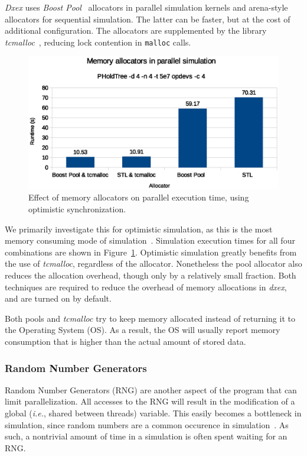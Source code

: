 \textit{Dxex} uses \textit{Boost Pool}~\cite{boostpool} allocators in parallel simulation kernels and arena-style allocators for sequential simulation.
The latter can be faster, but at the cost of additional configuration.
The allocators are supplemented by the library \textit{tcmalloc}~\cite{tcmalloc}, reducing lock contention in \texttt{malloc} calls.

\begin{figure}
    \center
    \includegraphics[width=\columnwidth]{fig/memory_allocators_parallel.eps}
    \caption{Effect of memory allocators on parallel execution time, using optimistic synchronization.}
    \label{fig:memallocators_parallel}
\end{figure}

We primarily investigate this for optimistic simulation, as this is the most memory consuming mode of simulation~\cite{FujimotoBook}.
Simulation execution times for all four combinations are shown in Figure~\ref{fig:memallocators_parallel}.
Optimistic simulation greatly benefits from the use of \textit{tcmalloc}, regardless of the allocator.
Nonetheless the pool allocator also reduces the allocation overhead, though only by a relatively small fraction.
Both techniques are required to reduce the overhead of memory allocations in \textit{dxex}, and are turned on by default.

Both pools and \textit{tcmalloc} try to keep memory allocated instead of returning it to the Operating System (OS).
As a result, the OS will usually report memory consumption that is higher than the actual amount of stored data.

\subsubsection{Random Number Generators}
Random Number Generators (RNG) are another aspect of the program that can limit parallelization.
All accesses to the RNG will result in the modification of a global (\textit{i.e.}, shared between threads) variable.
This easily becomes a bottleneck in simulation, since random numbers are a common occurence in simulation~\cite{Random}.
As such, a nontrivial amount of time in a simulation is often spent waiting for an RNG.

